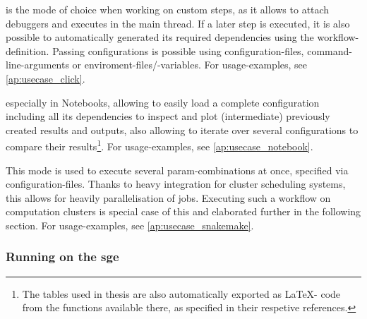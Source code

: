 \begin{description}[style=unboxed]
	\item[Running individual Steps per \gls{cli}] is the mode of choice when working on custom steps, as it allows to attach debuggers and executes in the main thread. If a later step is executed, it is also possible to automatically generated its required dependencies using the workflow-definition. Passing configurations is possible using configuration-files, command-line-arguments or enviroment-files/-variables. For usage-examples, see \autoref{ap:usecase_click}.
	\item[Loading existing Configurations for inspection] especially in Notebooks, allowing to easily load a complete configuration including all its dependencies to inspect and plot (intermediate) previously created results and outputs, also allowing to iterate over several configurations to compare their results\footnote{The tables used in thesis are also automatically exported as \LaTeX- code from the functions available there, as specified in their respetive references.}. For usage-examples, see \autoref{ap:usecase_notebook}.
	\item[Running/Scheduling a Workflow] This mode is used to execute several \gls{param}-combinations at once, specified via configuration-files. Thanks to heavy integration for cluster scheduling systems, this allows for heavily parallelisation of jobs. Executing such a workflow on computation clusters is special case of this and elaborated further in the following section. For usage-examples, see \autoref{ap:usecase_snakemake}.
\end{description}


\subsubsection*{Running on the \gls{sge}}

